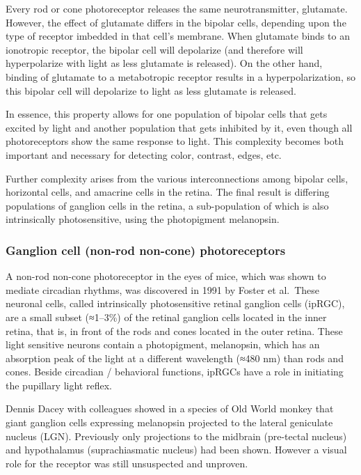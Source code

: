 \documentclass[]{book}
\begin{document}
Every rod or cone photoreceptor releases the same neurotransmitter, glutamate. However, the effect of glutamate differs in the bipolar cells, depending upon the type of receptor imbedded in that cell's membrane. When glutamate binds to an ionotropic receptor, the bipolar cell will depolarize (and therefore will hyperpolarize with light as less glutamate is released). On the other hand, binding of glutamate to a metabotropic receptor results in a hyperpolarization, so this bipolar cell will depolarize to light as less glutamate is released.

In essence, this property allows for one population of bipolar cells that gets excited by light and another population that gets inhibited by it, even though all photoreceptors show the same response to light. This complexity becomes both important and necessary for detecting color, contrast, edges, etc.

Further complexity arises from the various interconnections among bipolar cells, horizontal cells, and amacrine cells in the retina. The final result is differing populations of ganglion cells in the retina, a sub-population of which is also intrinsically photosensitive, using the photopigment melanopsin.

\hypertarget{ganglion-cell-non-rod-non-cone-photoreceptors}{%
\subsubsection{Ganglion cell (non-rod non-cone) photoreceptors}\label{ganglion-cell-non-rod-non-cone-photoreceptors}}

A non-rod non-cone photoreceptor in the eyes of mice, which was shown to mediate circadian rhythms, was discovered in 1991 by Foster et al.~These neuronal cells, called intrinsically photosensitive retinal ganglion cells (ipRGC), are a small subset (≈1--3\%) of the retinal ganglion cells located in the inner retina, that is, in front of the rods and cones located in the outer retina. These light sensitive neurons contain a photopigment, melanopsin, which has an absorption peak of the light at a different wavelength (≈480 nm) than rods and cones. Beside circadian / behavioral functions, ipRGCs have a role in initiating the pupillary light reflex.

Dennis Dacey with colleagues showed in a species of Old World monkey that giant ganglion cells expressing melanopsin projected to the lateral geniculate nucleus (LGN). Previously only projections to the midbrain (pre-tectal nucleus) and hypothalamus (suprachiasmatic nucleus) had been shown. However a visual role for the receptor was still unsuspected and unproven.
\end{document}
